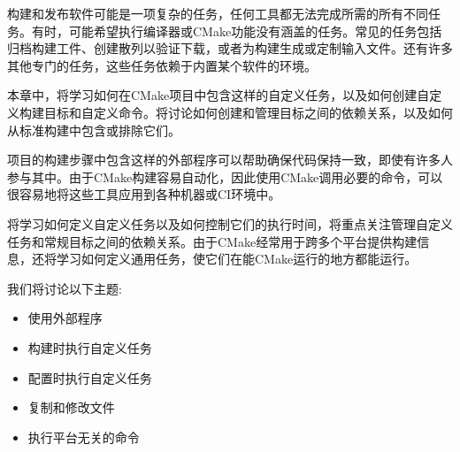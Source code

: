 构建和发布软件可能是一项复杂的任务，任何工具都无法完成所需的所有不同任务。有时，可能希望执行编译器或CMake功能没有涵盖的任务。常见的任务包括归档构建工件、创建散列以验证下载，或者为构建生成或定制输入文件。还有许多其他专门的任务，这些任务依赖于内置某个软件的环境。

本章中，将学习如何在CMake项目中包含这样的自定义任务，以及如何创建自定义构建目标和自定义命令。将讨论如何创建和管理目标之间的依赖关系，以及如何从标准构建中包含或排除它们。

项目的构建步骤中包含这样的外部程序可以帮助确保代码保持一致，即使有许多人参与其中。由于CMake构建容易自动化，因此使用CMake调用必要的命令，可以很容易地将这些工具应用到各种机器或CI环境中。

将学习如何定义自定义任务以及如何控制它们的执行时间，将重点关注管理自定义任务和常规目标之间的依赖关系。由于CMake经常用于跨多个平台提供构建信息，还将学习如何定义通用任务，使它们在能CMake运行的地方都能运行。

我们将讨论以下主题:

\begin{itemize}
\item 
使用外部程序

\item 
构建时执行自定义任务

\item 
配置时执行自定义任务

\item 
复制和修改文件

\item 
执行平台无关的命令
\end{itemize}





